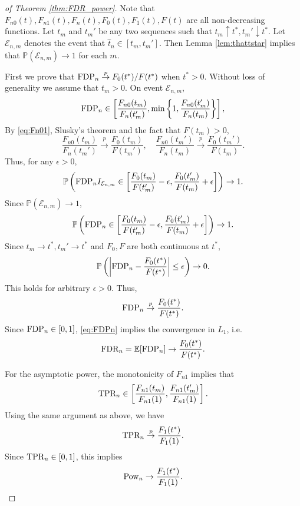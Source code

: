\documentclass{biometrika}
\newcommand{\cE}{\mathcal{E}}
\newcommand{\FDP}{\textnormal{FDP}}
\newcommand{\FDR}{\textnormal{FDR}}
\newcommand{\Pow}{\textnormal{Pow}}
\newcommand{\TPR}{\textnormal{TPR}}
\newcommand{\eps}{\epsilon}
\newcommand{\lb}{\left(}
\newcommand{\rb}{\right)}
\newcommand{\E}{\mathbb{E}}
\renewcommand{\P}{\mathbb{P}}
\newcommand{\1}{\mathbf{1}}
\begin{document}
\begin{proof}[of Theorem \ref{thm:FDR_power}]
Note that $F_{n0}(t), F_{n1}(t), F_{n}(t), F_{0}(t), F_{1}(t), F(t)$ are all non-decreasing functions. Let $t_{m}$ and $t_{m}'$ be any two sequences such that $t_{m}\uparrow t^{*}, t_{m}'\downarrow t^{*}$. Let $\cE_{n, m}$ denotes the event that $\hat{t}_{n}\in [t_{m}, t_{m}']$. Then Lemma \ref{lem:thattstar} implies that $\P(\cE_{n, m})\rightarrow 1$ for each $m$. 

First we prove that $\FDP_{n}\stackrel{p}{\rightarrow} F_{0}(t^{*}) / F(t^{*})$ when $t^{*} > 0$. Without loss of generality we assume that $t_{m} > 0$. On event $\cE_{n, m}$,
\[\FDP_{n}\in \left[\frac{F_{n0}(t_{m})}{F_{n}(t_{m}')}, \min\left\{1, \frac{F_{n0}(t_{m}')}{F_{n}(t_{m})}\right\}\right], \]
By \eqref{eq:Fn01}, Slusky's theorem and the fact that $F(t_{m}) > 0$, 
\[\frac{F_{n0}(t_{m})}{F_{n}(t_{m}')}\stackrel{p}{\rightarrow} \frac{F_{0}(t_{m})}{F(t_{m}')}, \quad \frac{F_{n0}(t_{m}')}{F_{n}(t_{m})}\stackrel{p}{\rightarrow} \frac{F_{0}(t_{m}')}{F(t_{m})}.\]
Thus, for any $\eps > 0$, 
\[\P\lb \FDP_{n}I_{\cE_{n, m}}\in \left[\frac{F_{0}(t_{m})}{F(t_{m}')} - \eps, \frac{F_{0}(t_{m}')}{F(t_{m})} + \eps\right]\rb\rightarrow 1.\]
Since $\P(\cE_{n, m})\rightarrow 1$, 
\[\P\lb \FDP_{n}\in \left[\frac{F_{0}(t_{m})}{F(t_{m}')} - \eps, \frac{F_{0}(t_{m}')}{F(t_{m})} + \eps\right]\rb\rightarrow 1.\]
Since $t_{m}\rightarrow t^{*}, t_{m}' \rightarrow t^{*}$ and $F_{0}, F$ are both continuous at $t^{*}$, 
\[\P\lb \bigg|\FDP_{n} - \frac{F_{0}(t^{*})}{F(t^{*})}\bigg|\le \eps\rb\rightarrow 0.\]
This holds for arbitrary $\eps > 0$. Thus,
\begin{equation}
  \label{eq:FDPn}
  \FDP_{n}\stackrel{p}{\rightarrow} \frac{F_{0}(t^{*})}{F(t^{*})}.
\end{equation}
Since $\FDP_{n}\in [0, 1]$, \eqref{eq:FDPn} implies the convergence in $L_{1}$, i.e.
\[\FDR_{n} = \E [\FDP_{n}]\rightarrow \frac{F_{0}(t^{*})}{F(t^{*})}.\]

For the asymptotic power, the monotonicity of $F_{n1}$ implies that 
\[\TPR_{n} \in \left[\frac{F_{n1}(t_{m})}{F_{n1}(1)}, \frac{F_{n1}(t_{m}')}{F_{n1}(1)}\right].\]
Using the same argument as above, we have
\[\TPR_{n}\stackrel{p}{\rightarrow} \frac{F_{1}(t^{*})}{F_{1}(1)}.\]
Since $\TPR_{n}\in [0, 1]$, this implies 
\[\Pow_{n}\rightarrow \frac{F_{1}(t^{*})}{F_{1}(1)}.\]
\end{proof}
\end{document}
